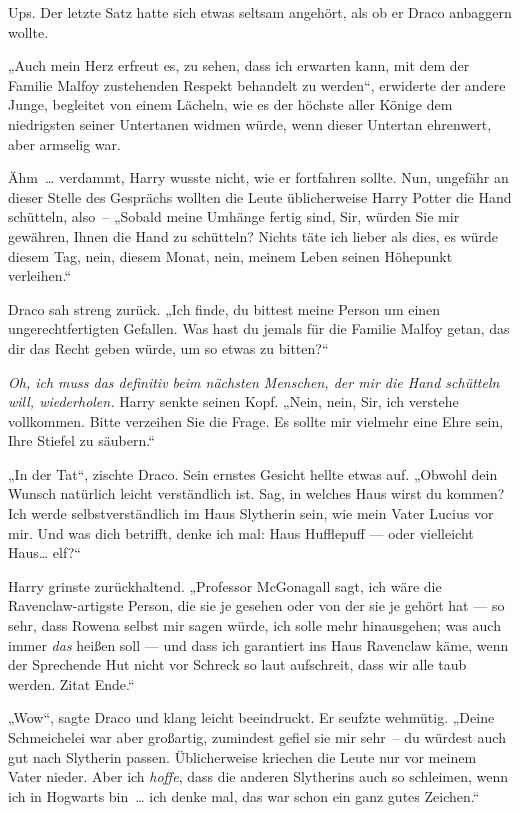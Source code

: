 {Ups. Der letzte Satz hatte sich etwas seltsam angehört, als ob er Draco anbaggern wollte.

„Auch mein Herz erfreut es, zu sehen, dass ich erwarten kann, mit dem der Familie Malfoy zustehenden Respekt behandelt zu werden“, erwiderte der andere Junge, begleitet von einem Lächeln, wie es der höchste aller Könige dem niedrigsten seiner Untertanen widmen würde, wenn dieser Untertan ehrenwert, aber armselig war.

Ähm~… verdammt, Harry wusste nicht, wie er fortfahren sollte. Nun, ungefähr an dieser Stelle des Gesprächs wollten die Leute üblicherweise Harry Potter die Hand schütteln, also~-- „Sobald meine Umhänge fertig sind, Sir, würden Sie mir gewähren, Ihnen die Hand zu schütteln? Nichts täte ich lieber als dies, es würde diesem Tag, nein, diesem Monat, nein, meinem Leben seinen Höhepunkt verleihen.“

Draco sah streng zurück. „Ich finde, du bittest meine Person um einen ungerechtfertigten Gefallen. Was hast du jemals für die Familie Malfoy getan, das dir das Recht geben würde, um so etwas zu bitten?“

\emph{Oh, ich muss das definitiv beim nächsten Menschen, der mir die Hand schütteln will, wiederholen.} Harry senkte seinen Kopf. „Nein, nein, Sir, ich verstehe vollkommen. Bitte verzeihen Sie die Frage. Es sollte mir vielmehr eine Ehre sein, Ihre Stiefel zu säubern.“

„In der Tat“, zischte Draco. Sein ernstes Gesicht hellte etwas auf. „Obwohl dein Wunsch natürlich leicht verständlich ist. Sag, in welches Haus wirst du kommen? Ich werde selbstverständlich im Haus Slytherin sein, wie mein Vater Lucius vor mir. Und was dich betrifft, denke ich mal: Haus Hufflepuff --- oder vielleicht Haus… elf?“

Harry grinste zurückhaltend. „Professor McGonagall sagt, ich wäre die Ravenclaw-artigste Person, die sie je gesehen oder von der sie je gehört hat --- so sehr, dass Rowena selbst mir sagen würde, ich solle mehr hinausgehen; was auch immer \emph{das} heißen soll --- und dass ich garantiert ins Haus Ravenclaw käme, wenn der Sprechende Hut nicht vor Schreck so laut aufschreit, dass wir alle taub werden. Zitat Ende.“

„Wow“, sagte Draco und klang leicht beeindruckt. Er seufzte wehmütig. „Deine Schmeichelei war aber großartig, zumindest gefiel sie mir sehr~-- du würdest auch gut nach Slytherin passen. Üblicherweise kriechen die Leute nur vor meinem Vater nieder. Aber ich \emph{hoffe}, dass die anderen Slytherins auch so schleimen, wenn ich in Hogwarts bin~… ich denke mal, das war schon ein ganz gutes Zeichen.“

}
